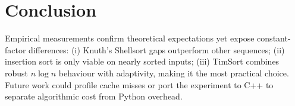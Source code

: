 \documentclass[11pt]{article}
\begin{document}
\section{Conclusion}
Empirical measurements confirm theoretical expectations yet expose
constant-factor differences: (i) Knuth’s Shellsort gaps outperform other
sequences; (ii) insertion sort is only viable on nearly sorted inputs;
(iii) TimSort combines robust $n\log n$ behaviour with adaptivity,
making it the most practical choice.  Future work could profile cache
misses or port the experiment to C++ to separate algorithmic cost from
Python overhead.
\end{document}

